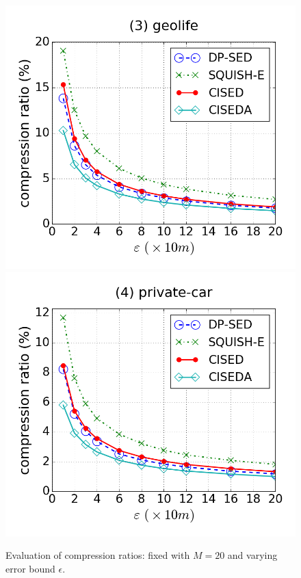 \begin{figure}[tb!]
\includegraphics[scale = 0.245]{figures/Exp-cr-epsilon-geolife.png}
\includegraphics[scale = 0.245]{figures/Exp-cr-epsilon-private.png}
\vspace{-3ex}
\caption{\small Evaluation of compression ratios: fixed with $M=20$ and varying error bound $\epsilon$.}
\label{fig:cr-m20}
\vspace{-2.0ex}
\end{figure}


